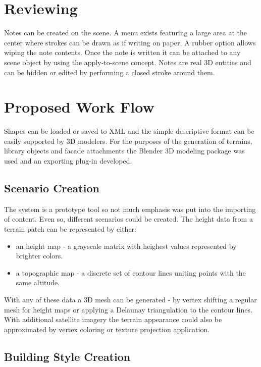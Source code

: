 \section{Reviewing}

Notes can be created on the scene. A menu exists featuring a large area at the center where strokes can be drawn as if writing on paper.
A rubber option allows wiping the note contents. Once the note is written it can be attached to any scene object by using the
apply-to-scene concept. Notes are real 3D entities and can be hidden or edited by performing a closed stroke around them.



\section{Proposed Work Flow}

Shapes can be loaded or saved to XML and the simple descriptive format can be easily supported by 3D modelers.
For the purposes of the generation of terrains, library objects and facade attachments the Blender 3D modeling package
was used and an exporting plug-in developed.

\subsection{Scenario Creation}

The system is a prototype tool so not much emphasis was put into the importing of content.
Even so, different scenarios could be created.
The height data from a terrain patch can be represented by either:
\begin{itemize}
	\item an height map - a grayscale matrix with heighest values represented by brighter colors.
	\item a topographic map - a discrete set of contour lines uniting points with the same altitude.
\end{itemize}

With any of these data a 3D mesh can be generated - by vertex shifting a regular mesh for height maps or applying
a Delaunay triangulation to the contour lines.
With additional satellite imagery the terrain appearance could also be approximated by vertex coloring or texture projection application.


\subsection{Building Style Creation}

